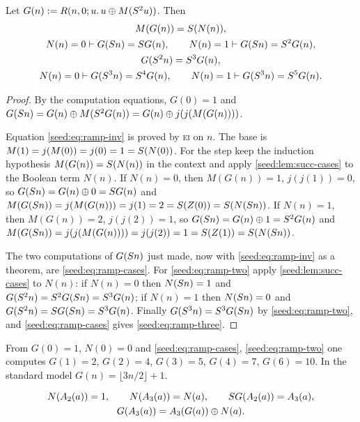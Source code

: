 \begin{lemma}\label{seed:lem:succ-ramp}
Let $G(n)\mathrel{:=} R(n,0;u.\,u\oplus M(S^2u))$. Then
\begin{gather}
 M(G(n))=S(N(n)), \label{seed:eq:ramp-inv}\\
 N(n)=0\vdash G(S n)=S G(n),\qquad
 N(n)=1\vdash G(S n)=S^2G(n), \label{seed:eq:ramp-cases}\\
 G(S^2n)=S^3G(n), \label{seed:eq:ramp-two}\\
 N(n)=0\vdash G(S^3n)=S^4G(n),\qquad
 N(n)=1\vdash G(S^3n)=S^5G(n). \label{seed:eq:ramp-three}
\end{gather}
\end{lemma}

\begin{proof}
By the computation equations, $G(0)=1$ and
$G(S n)=G(n)\oplus M(S^2G(n))=G(n)\oplus j(j(M(G(n))))$.

Equation \eqref{seed:eq:ramp-inv} is proved by \textsc{ei} on $n$. The base
is $M(1)=j(M(0))=j(0)=1=S(N(0))$. For the step keep the induction
hypothesis $M(G(n))=S(N(n))$ in the context and apply
\cref{seed:lem:succ-cases} to the Boolean term $N(n)$. If $N(n)=0$, then
$M(G(n))=1$, $j(j(1))=0$, so $G(S n)=G(n)\oplus0=S G(n)$ and
$M(G(S n))=j(M(G(n)))=j(1)=2=S(Z(0))=S(N(S n))$. If $N(n)=1$,
then $M(G(n))=2$, $j(j(2))=1$, so
$G(S n)=G(n)\oplus1=S^2G(n)$ and
$M(G(S n))=j(j(M(G(n))))=j(j(2))=1=S(Z(1))=S(N(S n))$.

The two computations of $G(S n)$ just made, now with
\eqref{seed:eq:ramp-inv} as a theorem, are \eqref{seed:eq:ramp-cases}. For
\eqref{seed:eq:ramp-two} apply \cref{seed:lem:succ-cases} to $N(n)$: if
$N(n)=0$ then $N(S n)=1$ and
$G(S^2n)=S^2G(S n)=S^3G(n)$; if $N(n)=1$ then $N(S n)=0$ and
$G(S^2n)=S G(S n)=S^3G(n)$. Finally
$G(S^3n)=S^3G(S n)$ by \eqref{seed:eq:ramp-two}, and
\eqref{seed:eq:ramp-cases} gives \eqref{seed:eq:ramp-three}.
\end{proof}

From $G(0)=1$, $N(0)=0$ and \eqref{seed:eq:ramp-cases},
\eqref{seed:eq:ramp-two} one computes
$G(1)=2$, $G(2)=4$, $G(3)=5$, $G(4)=7$, $G(6)=10$. In the standard model
$G(n)=\lfloor 3n/2\rfloor+1$.

\begin{lemma}\label{seed:lem:succ-affine}
\begin{gather*}
 N(A_2(a))=1,\qquad N(A_3(a))=N(a),\qquad S G(A_2(a))=A_3(a),\\
 G(A_3(a))=A_3(G(a))\oplus N(a).
\end{gather*}
\end{lemma}

